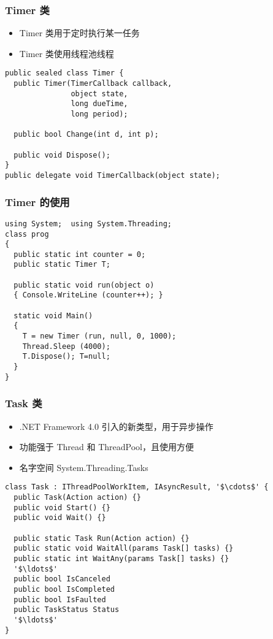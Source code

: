 \begin{frame}[fragile]
\frametitle{Timer 类}
\begin{itemize}
\item Timer 类用于定时执行某一任务
\item Timer 类使用线程池线程
\end{itemize}
\begin{lstlisting}
public sealed class Timer {
  public Timer(TimerCallback callback,
               object state,
               long dueTime, 
               long period);

  public bool Change(int d, int p);

  public void Dispose();
}
public delegate void TimerCallback(object state);
\end{lstlisting}
\end{frame}

\begin{frame}[fragile]
\frametitle{Timer 的使用}
\begin{lstlisting}
using System;  using System.Threading;
class prog
{
  public static int counter = 0;
  public static Timer T;

  public static void run(object o)
  { Console.WriteLine (counter++); }

  static void Main()
  {
    T = new Timer (run, null, 0, 1000);
    Thread.Sleep (4000);
    T.Dispose(); T=null;
  }
}
\end{lstlisting}
\end{frame}

\begin{frame}[fragile]
\frametitle{Task 类}
\begin{itemize}
\item .NET Framework 4.0 引入的新类型，用于异步操作
\item 功能强于 Thread 和 ThreadPool，且使用方便
\item 名字空间 System.Threading.Tasks
\end{itemize}
\begin{lstlisting}[escapeinside='']
class Task : IThreadPoolWorkItem, IAsyncResult, '$\cdots$' {
  public Task(Action action) {}
  public void Start() {}
  public void Wait() {}

  public static Task Run(Action action) {}
  public static void WaitAll(params Task[] tasks) {}
  public static int WaitAny(params Task[] tasks) {}
  '$\ldots$'
  public bool IsCanceled
  public bool IsCompleted
  public bool IsFaulted
  public TaskStatus Status
  '$\ldots$'
}
\end{lstlisting}

\end{frame}

